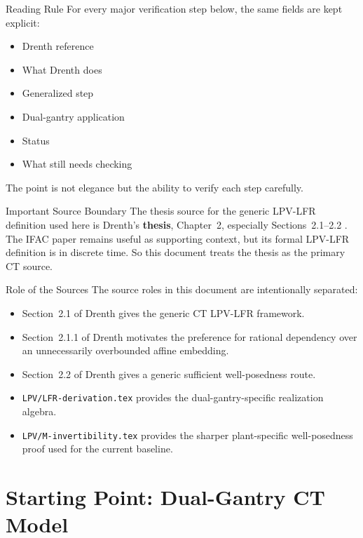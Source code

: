 ﻿\documentclass[11pt]{article}
\begin{document}
\begin{notebox}{Reading Rule}
For every major verification step below, the same fields are kept explicit:
\begin{itemize}[leftmargin=1.2em]
    \item Drenth reference
    \item What Drenth does
    \item Generalized step
    \item Dual-gantry application
    \item Status
    \item What still needs checking
\end{itemize}
The point is not elegance but the ability to verify each step carefully.
\end{notebox}

\begin{warningbox}{Important Source Boundary}
The thesis source for the generic LPV-LFR definition used here is Drenth's
\textbf{thesis}, Chapter~2, especially Sections~2.1--2.2
\cite{drenth2025thesis}. The IFAC paper \cite{drenth2025lpvlfr} remains useful
as supporting context, but its formal LPV-LFR definition is in discrete time.
So this document treats the thesis as the primary CT source.
\end{warningbox}

\begin{notebox}{Role of the Sources}
The source roles in this document are intentionally separated:
\begin{itemize}[leftmargin=1.2em]
    \item Section~2.1 of Drenth gives the generic CT LPV-LFR framework.
    \item Section~2.1.1 of Drenth motivates the preference for rational
    dependency over an unnecessarily overbounded affine embedding.
    \item Section~2.2 of Drenth gives a generic sufficient well-posedness route.
    \item \texttt{LPV/LFR-derivation.tex} provides the dual-gantry-specific
    realization algebra.
    \item \texttt{LPV/M-invertibility.tex} provides the sharper
    plant-specific well-posedness proof used for the current baseline.
\end{itemize}
\end{notebox}

\section{Starting Point: Dual-Gantry CT Model}
\end{document}
